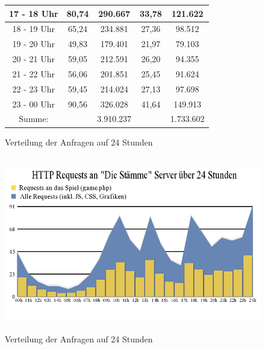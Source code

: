 \documentclass[10pt]{scrartcl}
\begin{document}
\begin{figure}[htbp]
\begin{tabular}{|c|c|c|c|c|}
    \hline                         
    17 - 18 Uhr & 80,74 & 290.667  & 33,78 & 121.622 \\
    \hline                         
    18 - 19 Uhr & 65,24 & 234.881  & 27,36 & 98.512 \\
    \hline                         
    19 - 20 Uhr & 49,83 & 179.401  & 21,97 & 79.103 \\
    \hline                         
    20 - 21 Uhr & 59,05 & 212.591  & 26,20 & 94.355 \\
    \hline                         
    21 - 22 Uhr & 56,06 & 201.851  & 25,45 & 91.624 \\
    \hline                         
    22 - 23 Uhr & 59,45 & 214.024  & 27,13 & 97.698 \\
    \hline                         
    23 - 00 Uhr & 90,56 & 326.028  & 41,64 & 149.913 \\
    \hline
    Summe: & & 3.910.237 & & 1.733.602\\
    \hline
    \end{tabular}

    \caption{Verteilung der Anfragen auf 24 Stunden}
    \label{fig:requests_per_day_derivation_table}
  \end{figure}
  
  \begin{figure}[htbp]
    \centering
      \includegraphics[height=3in]{img/requests.png}
    \caption{Verteilung der Anfragen auf 24 Stunden}
    \label{fig:requests_per_day_derivation_img}
  \end{figure}
\end{document}
